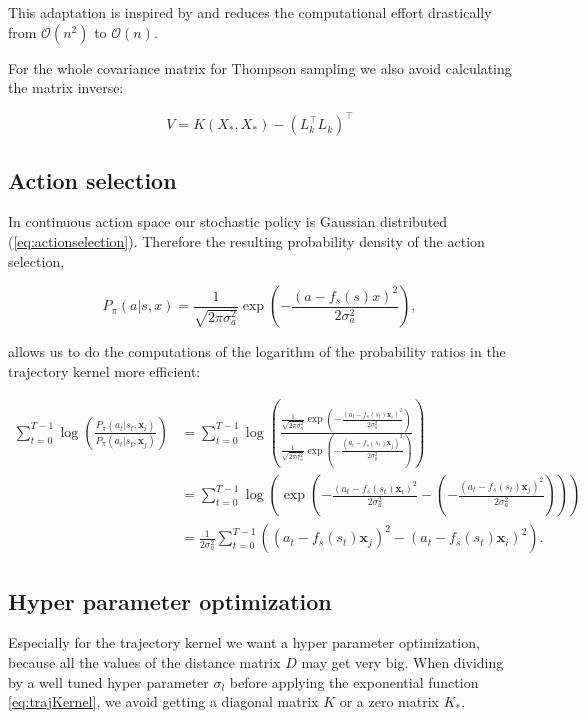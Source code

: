 This adaptation is inspired by \cite{nandoCode} and reduces the computational effort drastically from $\mathcal{O}(n^2)$ to $\mathcal{O}(n)$.

For the whole covariance matrix for Thompson sampling we also avoid calculating the matrix inverse:

$$V = K(X_*,X_*) - (L_k^\top L_k)^\top $$

\subsection{Action selection}

In continuous action space our stochastic policy is Gaussian distributed (\ref{eq:actionselection}). Therefore the resulting probability density of the action selection,

$$P_{\pi}(a|s,x) = \frac{1}{\sqrt{2\pi\sigma_a^2}}\exp\left(-\frac{(a-f_s(s)x)^2}{2\sigma_a^2}\right),$$

allows us to do the computations of the logarithm of the probability ratios in the trajectory kernel more efficient:

\begin{align*}
    \sum_{t=0}^{T-1} \log \left(\frac{P_{\pi}(a_{t}|s_{t},\mathbf{x}_i)}{P_{\pi}(a_{t}|s_{t},\mathbf{x}_j)}\right) &= \sum_{t=0}^{T-1} \log \left(\frac{\frac{1}{\sqrt{2\pi\sigma_a^2}}\exp\left(-\frac{(a_t-f_s(s_t)\mathbf{x}_i)^2}{2\sigma_a^2}\right)}{\frac{1}{\sqrt{2\pi\sigma_a^2}}\exp\left(-\frac{(a_t-f_s(s_t)\mathbf{x}_j)^2}{2\sigma_a^2}\right)}\right)\\
    &= \sum_{t=0}^{T-1} \log \left( \exp \left( -\frac{(a_t-f_s(s_t)\mathbf{x}_i)^2}{2\sigma_a^2} - \left(-\frac{(a_t-f_s(s_t)\mathbf{x}_j)^2}{2\sigma_a^2}\right)\right)\right)\\
    &= \frac{1}{2\sigma_a^2} \sum_{t=0}^{T-1} \left((a_t-f_s(s_t)\mathbf{x}_j)^2 - (a_t-f_s(s_t)\mathbf{x}_i)^2\right).
\end{align*}

\subsection{Hyper parameter optimization}

Especially for the trajectory kernel we want a hyper parameter optimization, because all the values of the distance matrix $D$ may get very big. When dividing by a well tuned hyper parameter $\sigma_l$ before applying the exponential function \eqref{eq:trajKernel}, we avoid getting a diagonal matrix $K$ or a zero matrix $K_*$.\\

